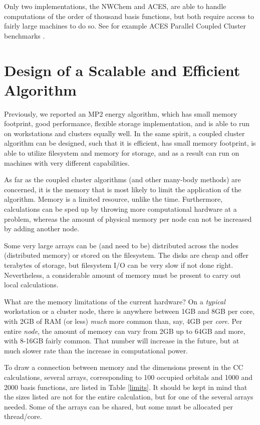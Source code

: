 \documentclass[12pt]{article} \usepackage[margin=1in]{geometry}
\begin{document}
Only two implementations, the NWChem and ACES, are able to
handle computations of the order of thousand basis functions, but both
require access to fairly large machines to do so.  See for example
ACES Parallel Coupled Cluster benchmarks \cite{pcc}.

\section{Design of a Scalable and Efficient Algorithm}
Previously, we reported an MP2 energy algorithm, which has small
memory footprint, good performance, flexible storage implementation,
and is able to run on workstations and clusters equally well.  In the
same spirit, a coupled cluster algorithm can be designed, such that it
is efficient, has small memory footprint, is able to utilize filesystem
and memory for storage, and as a result can run on machines with very
different capabilities.

As far as the coupled cluster algorithms (and other many-body methods)
are concerned, it is the memory that is most likely to limit the
application of the algorithm.  Memory is a limited resource, unlike
the time.  Furthermore, calculations can be sped up by throwing more
computational hardware at a problem, whereas the amount of physical
memory per node can not be increased by adding another node.

Some very large arrays can be (and need to be) distributed across the nodes
(distributed memory) or stored on the filesystem.  The disks are cheap
and offer terabytes of storage, but filesystem I/O can be very slow if
not done right.  Nevertheless, a considerable amount of memory must be
present to carry out local calculations.

What are the memory limitations of the current hardware?  On a
{\it typical} workstation or a cluster node, there is anywhere between
1GB and 8GB per core, with 2GB of RAM (or less) {\it much} more common
than, say, 4GB per {\it core}.  Per entire {\it node}, the amount of
memory can vary from 2GB up to 64GB and more, with 8-16GB fairly
common.  That number will increase in the future, but at much slower
rate than the increase in computational power.

To draw a connection between memory and the dimensions present in the CC
calculations, several arrays, corresponding to 100 occupied
orbitals and 1000 and 2000 basis functions, are listed in Table
\ref{limits}.  It should be kept in mind that the sizes listed are not
for the entire calculation, but for one of the several arrays needed.
Some of the arrays can be shared, but some must be allocated per
thread/core.
\end{document}
